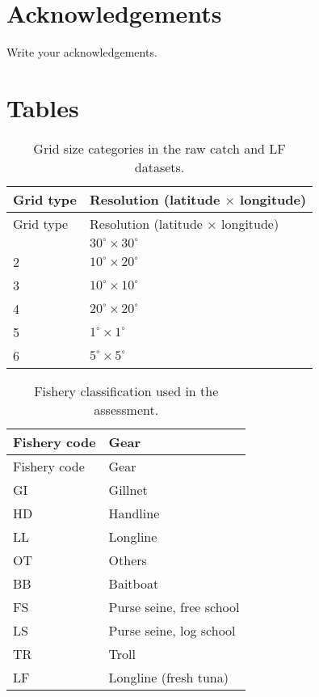 \documentclass[
]{scrartcl}
\begin{document}
\section{Acknowledgements}\label{acknowledgements}

Write your acknowledgements.

\newpage{}

\section{Tables}\label{tables}

\begin{longtable}[]{@{}ll@{}}
\caption{Grid size categories in the raw catch and LF
datasets.}\label{tbl-grid-size}\tabularnewline
\toprule\noalign{}
Grid type & Resolution (latitude \(\times\) longitude) \\
\midrule\noalign{}
\endfirsthead
\toprule\noalign{}
Grid type & Resolution (latitude \(\times\) longitude) \\
\midrule\noalign{}
\endhead
\bottomrule\noalign{}
\endlastfoot
1 & \(30^\circ\times 30^\circ\) \\
2 & \(10^\circ\times 20^\circ\) \\
3 & \(10^\circ\times 10^\circ\) \\
4 & \(20^\circ\times 20^\circ\) \\
5 & \(1^\circ\times 1^\circ\) \\
6 & \(5^\circ\times 5^\circ\) \\
\end{longtable}

\newpage{}

\begin{longtable}[]{@{}ll@{}}
\caption{Fishery classification used in the
assessment.}\label{tbl-fishery-codes}\tabularnewline
\toprule\noalign{}
Fishery code & Gear \\
\midrule\noalign{}
\endfirsthead
\toprule\noalign{}
Fishery code & Gear \\
\midrule\noalign{}
\endhead
\bottomrule\noalign{}
\endlastfoot
GI & Gillnet \\
HD & Handline \\
LL & Longline \\
OT & Others \\
BB & Baitboat \\
FS & Purse seine, free school \\
LS & Purse seine, log school \\
TR & Troll \\
LF & Longline (fresh tuna) \\
\end{longtable}
\end{document}
